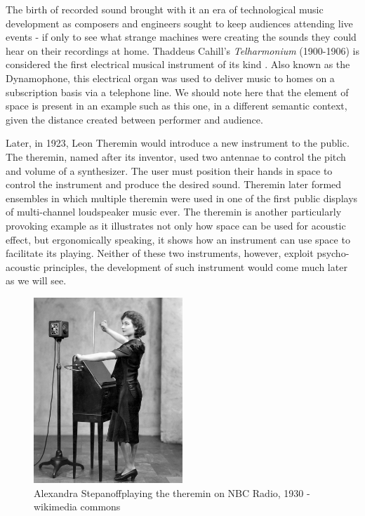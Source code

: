 The birth of recorded sound brought with it an era of technological music development as composers and engineers sought to keep audiences attending live events - if only to see what strange machines were creating the sounds they could hear on their recordings at home. Thaddeus Cahill's \textit{Telharmonium} (1900-1906) is considered the first electrical musical instrument of its kind \cite{bode1984history}. Also known as the Dynamophone, this electrical organ was used to deliver music to homes on a subscription basis via a telephone line. We should note here that the element of space is present in an example such as this one, in a different semantic context, given the distance created between performer and audience. 


Later, in 1923, Leon Theremin would introduce a new instrument to the public. The theremin, named after its inventor, used two antennae to control the pitch and volume of a synthesizer. The user must position their hands in space to control the instrument and produce the desired sound. Theremin later formed ensembles in which multiple theremin were used in one of the first public displays of multi-channel loudspeaker music ever. The theremin is another particularly provoking example as it illustrates not only how space can be used for acoustic effect, but ergonomically speaking, it shows how an instrument can use space to facilitate its playing. Neither of these two instruments, however, exploit psycho-acoustic principles, the development of such instrument would come much later as we will see.  %

\begin{figure}[h!]%
\centering
\includegraphics[width=0.5\textwidth]{img/theremin.jpg} 
\caption{Alexandra Stepanoff\protect\footnotemark playing the theremin on NBC Radio, 1930 - wikimedia commons}
\end{figure}

